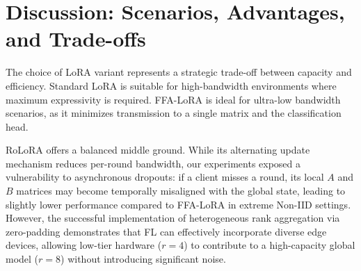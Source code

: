 \documentclass[journal]{IEEEtran}
\begin{document}
%



\section{Discussion: Scenarios, Advantages, and Trade-offs}
The choice of LoRA variant represents a strategic trade-off between capacity and efficiency. Standard LoRA is suitable for high-bandwidth environments where maximum expressivity is required. FFA-LoRA is ideal for ultra-low bandwidth scenarios, as it minimizes transmission to a single matrix and the classification head.

RoLoRA offers a balanced middle ground. While its alternating update mechanism reduces per-round bandwidth, our experiments exposed a vulnerability to asynchronous dropouts: if a client misses a round, its local $A$ and $B$ matrices may become temporally misaligned with the global state, leading to slightly lower performance compared to FFA-LoRA in extreme Non-IID settings. However, the successful implementation of heterogeneous rank aggregation via zero-padding demonstrates that FL can effectively incorporate diverse edge devices, allowing low-tier hardware ($r=4$) to contribute to a high-capacity global model ($r=8$) without introducing significant noise.
\end{document}
